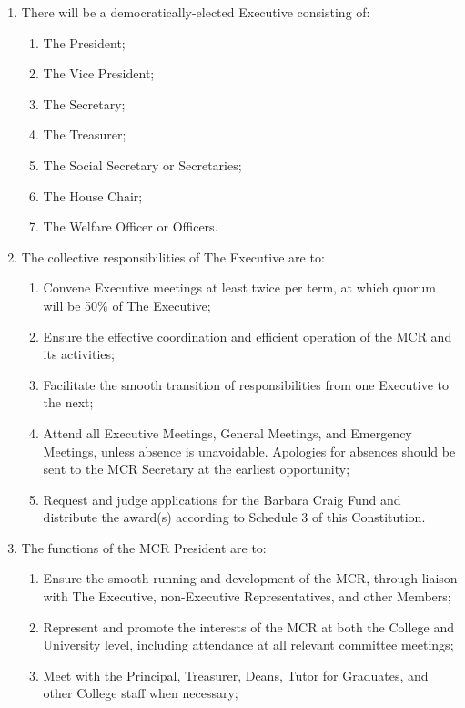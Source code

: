 \documentclass[11pt, a4paper]{article}
\begin{document}
\begin{enumerate}
    \item There will be a democratically-elected Executive consisting of:
    \begin{enumerate}
        \item The President;
        \item The Vice President;
        \item The Secretary;
        \item The Treasurer;
        \item The Social Secretary or Secretaries;
        \item The House Chair;
        \item The Welfare Officer or Officers.
    \end{enumerate}
    \item The collective responsibilities of The Executive are to:
    \begin{enumerate}
        \item Convene Executive meetings at least twice per term, at which quorum will be 50\% of The Executive;
        \item Ensure the effective coordination and efficient operation of the MCR and its activities;
        \item Facilitate the smooth transition of responsibilities from one Executive to the next;
        \item Attend all Executive Meetings, General Meetings, and Emergency Meetings, unless absence is unavoidable. Apologies for absences should be sent to the MCR Secretary at the earliest opportunity;
        \item Request and judge applications for the Barbara Craig Fund and distribute the award(s) according to Schedule 3 of this Constitution.
    \end{enumerate}
    \item The functions of the MCR President are to:
    \begin{enumerate}
        \item Ensure the smooth running and development of the MCR, through liaison with The Executive, non-Executive Representatives, and other Members;
        \item Represent and promote the interests of the MCR at both the College and University level, including attendance at all relevant committee meetings;
        \item Meet with the Principal, Treasurer, Deans, Tutor for Graduates, and other College staff when necessary;

\end{enumerate}
\end{enumerate}
\end{document}
